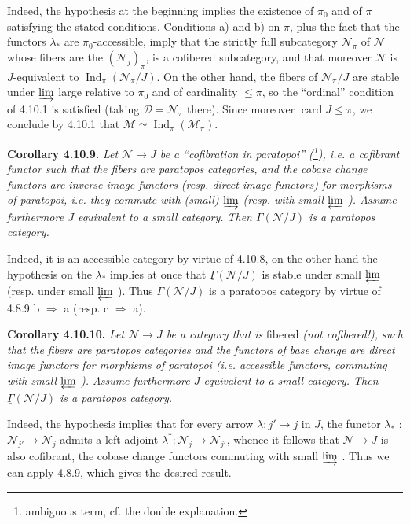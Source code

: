 \documentclass[11pt]{article}
\newcommand{\printedpage}[1]{\marginpar{\footnotesize p.~#1}}
\newcommand{\msp}[1]{\marginpar{\footnotesize [#1]}}
\newcommand{\uGamma}{\underline{\Gamma}}
\newcommand{\Ind}{\operatorname{Ind}}
\begin{document}
Indeed, the hypothesis at the beginning implies the existence of $\pi_0$ and of $\pi$ satisfying the stated conditions. Conditions a) and b) on $\pi$, plus the fact that the functors $\lambda_*$ are $\pi_0$-accessible, imply that the strictly full subcategory $\mathcal{N}_\pi$ of $\mathcal{N}$ whose fibers are the $(\mathcal{N}_j)_\pi$, is a cofibered subcategory, and that moreover $\mathcal{N}$ is $J$-equivalent to $\Ind_\pi(\mathcal{N}_\pi/J)$. On the other hand, the fibers of $\mathcal{N}_\pi/J$ are stable under $\varinjlim$ large relative to $\pi_0$ and of cardinality $\leqslant \pi$, so the ``ordinal'' condition of 4.10.1 is satisfied (taking $\mathcal{D} = \mathcal{N}_\pi$ there). Since moreover $\operatorname{card} J \leqslant \pi$, we conclude by 4.10.1 that $\mathcal{M} \simeq \Ind_\pi(\mathcal{M}_\pi)$.

\msp{page 265}

\textbf{Corollary 4.10.9.} \textit{Let $\mathcal{N} \longrightarrow J$ be a ``cofibration in paratopoi'' (\footnote{ambiguous term, cf. the double explanation.}), i.e. a cofibrant functor such that the fibers are paratopos categories, and the cobase change functors are inverse image functors (resp. direct image functors) for morphisms of paratopoi, i.e. they commute with (small) $\varinjlim$ (resp. with small $\varprojlim$ ). Assume furthermore $J$ equivalent to a small category. Then $\uGamma(\mathcal{N}/J)$ is a paratopos category.}

Indeed, it is an accessible category by virtue of 4.10.8, on the other hand the hypothesis on the $\lambda_*$ implies at once that $\uGamma(\mathcal{N}/J)$ is stable under small $\varprojlim$ (resp. under small $\varprojlim$
\printedpage{100}
). Thus $\uGamma(\mathcal{N}/J)$ is a paratopos category by virtue of 4.8.9 b $\Longrightarrow$ a (resp. c $\Longrightarrow$ a).

\textbf{Corollary 4.10.10.} \textit{Let $\mathcal{N} \longrightarrow J$ be a category that is} fibered \textit{(not cofibered!), such that the fibers are paratopos categories and the functors} \msp{page 266} \textit{of base change are direct image functors for morphisms of paratopoi (i.e. accessible functors, commuting with small $\varprojlim$ ). Assume furthermore $J$ equivalent to a small category. Then $\uGamma(\mathcal{N}/J)$ is a paratopos category.}

Indeed, the hypothesis implies that for every arrow $\lambda : j' \longrightarrow j$ in $J$, the functor $\lambda_*$ : $\mathcal{N}_{j'} \longrightarrow \mathcal{N}_j$ admits a left adjoint $\lambda^* : \mathcal{N}_j \longrightarrow \mathcal{N}_{j'}$, whence it follows that $\mathcal{N} \longrightarrow J$ is also cofibrant, the cobase change functors commuting with small $\varinjlim$ . Thus we can apply 4.8.9, which gives the desired result.
\end{document}

